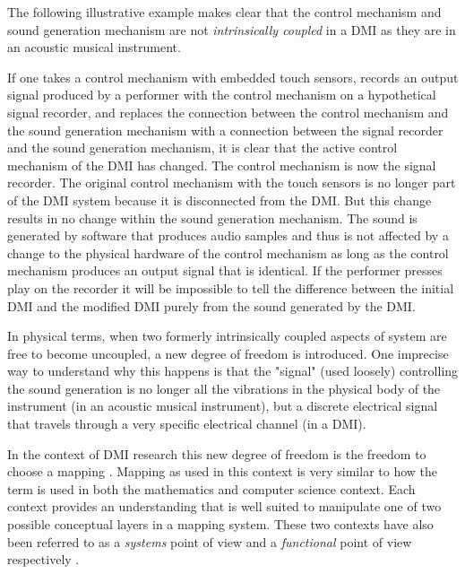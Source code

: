 The following illustrative example makes clear that the control mechanism and sound generation mechanism are not \emph{intrinsically coupled} in a DMI as they are in an acoustic musical instrument.

If one takes a control mechanism with embedded touch sensors, records an output signal produced by a performer with the control mechanism on a hypothetical signal recorder, and replaces the connection between the control mechanism and the sound generation mechanism with a connection between the signal recorder and the sound generation mechanism, it is clear that the active control mechanism of the DMI has changed. The control mechanism is now the signal recorder. The original control mechanism with the touch sensors is no longer part of the DMI system because it is disconnected from the DMI. But this change results in no change within the sound generation mechanism. The sound is generated by software that produces audio samples and thus is not affected by a change to the physical hardware of the control mechanism as long as the control mechanism produces an output signal that is identical. If the performer presses play on the recorder it will be impossible to tell the difference between the initial DMI and the modified DMI purely from the sound generated by the DMI.

In physical terms, when two formerly intrinsically coupled aspects of system are free to become uncoupled, a new degree of freedom is introduced. One imprecise way to understand why this happens is that the "signal" (used loosely) controlling the sound generation is no longer all the vibrations in the physical body of the instrument (in an acoustic musical instrument), but a discrete electrical signal that travels through a very specific electrical channel (in a DMI).

In the context of DMI research this new degree of freedom is the freedom to choose a mapping \cite{hunt2003}. Mapping as used in this context is very similar to how the term is used in both the mathematics and computer science context. Each context provides an understanding that is well suited to manipulate one of two possible conceptual layers in a mapping system. These two contexts have also been referred to as a \emph{systems} point of view and a \emph{functional} point of view respectively \cite{nort2010}. 

